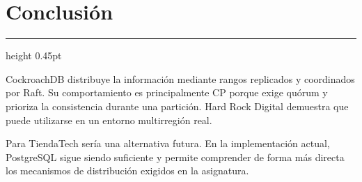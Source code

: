 \documentclass[11pt,a4paper]{article}
\newcommand{\sectionrule}{
    \vspace{-1pt}
    {\color{grisMedio}\hrule height 0.45pt}
    \vspace{2pt}
}
\begin{document}
\section{Conclusión}
\sectionrule

CockroachDB distribuye la información mediante rangos replicados y coordinados
por Raft. Su comportamiento es principalmente CP porque exige quórum y
prioriza la consistencia durante una partición. Hard Rock Digital demuestra
que puede utilizarse en un entorno multirregión real.

Para TiendaTech sería una alternativa futura. En la implementación actual,
PostgreSQL sigue siendo suficiente y permite comprender de forma más directa
los mecanismos de distribución exigidos en la asignatura.

\printbibliography[title={Referencias}]
\end{document}
